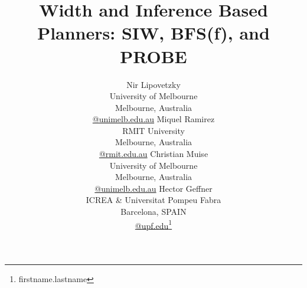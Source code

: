 \documentclass[letterpaper]{article}
\begin{document}
\title{Width and Inference Based Planners: SIW, BFS(f), and PROBE}


\author{Nir Lipovetzky \\
      University of Melbourne \\
   Melbourne, Australia\\ 
   {\normalsize\url{@unimelb.edu.au}}
   \And
   Miquel Ramirez \\
   RMIT University \\
   Melbourne, Australia\\ 
   {\normalsize\url{@rmit.edu.au}}
   \And
   Christian Muise \\
   University of Melbourne \\
   Melbourne, Australia\\ 
   {\normalsize\url{@unimelb.edu.au}}
   \And
        Hector Geffner \\
        ICREA \&  Universitat Pompeu Fabra \\
        Barcelona, SPAIN \\
        {\normalsize\url{@upf.edu}}\footnote{firstname.lastname}
}

\maketitle


\newcommand{\tuple}[1]{{\langle #1\rangle}}
\newcommand{\triple}[1]{{\langle #1\rangle}}
\newcommand{\pair}[1]{{\langle #1\rangle}}

\newcommand{\Omit}[1]{}

\newcommand{\OmitEcai}[1]{}

\newcommand{\eqdef}{\stackrel{\hbox{\tiny{def}}}{=}}
\newcommand{\IR}{{\textit{IW}}}
\newcommand{\SR}{{\textit{SIW}}}
\newcommand{\ID}{{\textit{ID}}}

\newcommand{\BRFS}{{\textit{BrFS}}}

 \newtheorem{theorem}{Theorem}


\newtheorem{proposition}[theorem]{Proposition}
\newtheorem{lemma}[theorem]{Lemma}
\newtheorem{corollary}[theorem]{Corollary}
\newtheorem{definition}[theorem]{Definition}
\end{document}
